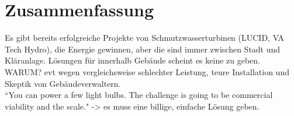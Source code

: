 \section{Zusammenfassung}

Es gibt bereits erfolgreiche Projekte von Schmutzwasserturbinen (LUCID, VA Tech Hydro), die Energie gewinnen, aber die sind immer zwischen Stadt und Kläranlage. Lösungen für innerhalb Gebäude scheint es keine zu geben. WARUM? evt wegen vergleichsweise schlechter Leistung, teure Installation und Skeptik von Gebäudeverwaltern.\\
“You can power a few light bulbs. The challenge is going to be commercial viability and the scale."
-> es muss eine billige, einfache Lösung geben.\\
